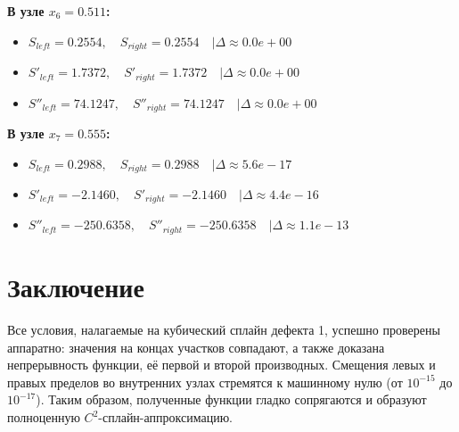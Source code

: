 \textbf{В узле $x_6 = 0.511$:}
\begin{itemize}
    \item $S_{left} = 0.2554, \quad S_{right} = 0.2554 \quad | \Delta \approx 0.0e+00$
    \item $S'_{left} = 1.7372, \quad S'_{right} = 1.7372 \quad | \Delta \approx 0.0e+00$
    \item $S''_{left} = 74.1247, \quad S''_{right} = 74.1247 \quad | \Delta \approx 0.0e+00$
\end{itemize}
\textbf{В узле $x_7 = 0.555$:}
\begin{itemize}
    \item $S_{left} = 0.2988, \quad S_{right} = 0.2988 \quad | \Delta \approx 5.6e-17$
    \item $S'_{left} = -2.1460, \quad S'_{right} = -2.1460 \quad | \Delta \approx 4.4e-16$
    \item $S''_{left} = -250.6358, \quad S''_{right} = -250.6358 \quad | \Delta \approx 1.1e-13$
\end{itemize}

\section{Заключение}
Все условия, налагаемые на кубический сплайн дефекта 1, успешно проверены аппаратно: значения на концах участков совпадают, а также доказана непрерывность функции, её первой и второй производных. Смещения левых и правых пределов во внутренних узлах стремятся к машинному нулю (от $10^{-15}$ до $10^{-17}$). Таким образом, полученные функции гладко сопрягаются и образуют полноценную $C^2$-сплайн-аппроксимацию.
